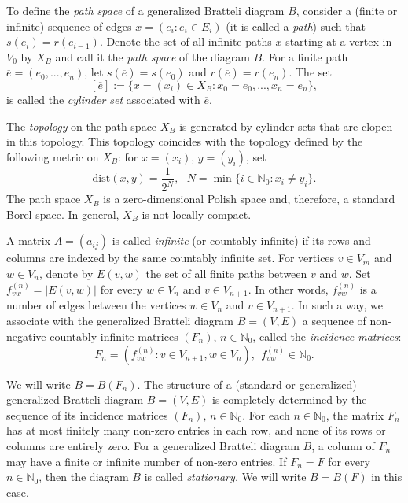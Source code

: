 \documentclass[11pt, twoside]{amsart}
\theoremstyle{definition}
\theoremstyle{remark}
\theoremstyle{plain}
\newcommand{\tcr}{\textcolor{red}}
\def\ol{\overline}
\newcommand{\N}{\mathbb N}
\numberwithin{equation}{section}
\begin{document}
To define the \textit{path space} of a generalized Bratteli diagram
$B$, consider 
a (finite or infinite) sequence of edges
 $ x = (e_i: e_i\in E_i)$ (it is called a \textit{path}) such 
that $s(e_i)=r(e_{i-1})$. Denote the set of all infinite
paths $x$ starting at a vertex in $V_0$ by $X_B$ and call 
it the \textit{path space} of the diagram $B$. For a finite path
$\ol e = (e_0, ... , e_n)$, let 
$s(\ol e) = s(e_0)$ and $r(\ol e) = r(e_n)$. The set
$$
    [\ol e] := \{x = (x_i) \in X_B : x_0 = e_0, ..., x_n = e_n\}, 
$$ 
is called the \textit{cylinder set} associated with $\ol e$.



The \textit{topology} on the path space $X_B$ is generated by
cylinder sets that are clopen in this topology.
This topology coincides with the topology defined by the 
following metric on $X_B$: for $x = (x_i), \, y = (y_i)$, set 
$$
\mathrm{dist}(x, y) = \frac{1}{2^N},\ \ \ N = \min\{i \in \N_0 : 
x_i \neq y_i\}.
$$
The path space $X_B$ is a zero-dimensional Polish space and, therefore, a standard Borel space. In general, $X_B$ is not locally compact. 


A matrix $A = (a_{ij})$ is called \textit{infinite} 
(or countably infinite) if its rows and columns
are indexed by the same countably infinite set.
For vertices $v \in V_m$ and $w \in V_{n}$, 
denote 
by $E(v, w)$ the set of all finite paths between $v$ and $w$. 
Set $f^{(n)}_{vw} = |E(v, w)|$ for every $w \in V_n$ and $v \in 
V_{n+1}$. In other words, $f^{(n)}_{vw}$ is a number of edges between the vertices $w \in V_n$ and $v \in V_{n+1}$. In such a way,  we associate with the generalized 
Bratteli diagram $B = (V,E)$ 
a sequence of non-negative countably infinite matrices $(F_n)$, 
$n \in \N_0$, 
called the \textit{incidence  matrices}: 
\begin{equation}\label{Notation:f^n}
    F_n = (f^{(n)}_{vw} : v \in V_{n+1}, w\in V_n),\ \   
    f^{(n)}_{vw}  \in \N_0.
\end{equation}

We will write $B = B(F_n)$. The structure of a (standard or generalized) generalized Bratteli diagram $B=(V, E)$ is 
completely determined by the sequence of its incidence matrices 
$(F_n), 
\, n \in \N_0$.  For each $n 
\in \N_0$, the matrix $F_n$ has at most finitely many non-zero 
entries in each row, and none of its rows or columns are entirely 
zero. For a generalized Bratteli diagram $B$, a column of $F_n$ may have a finite or infinite number of 
non-zero entries. 
If  $F_n = F$ for every $n \in 
\N_0$, then the diagram $B$ is called \textit{stationary.} We 
will write $B = B(F)$ in this case.
\end{document}
